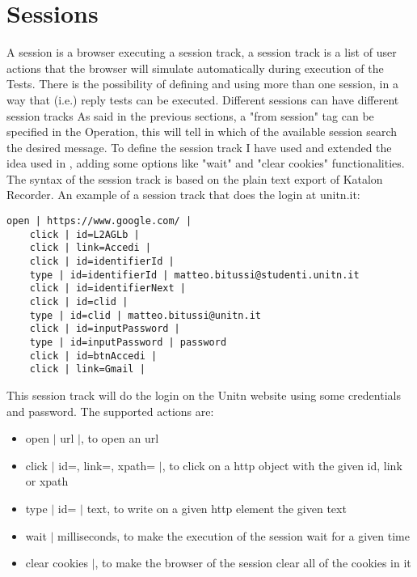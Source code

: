 \section{Sessions}
A session is a browser executing a \gls{session track}, a \gls{session track} is a list of user actions that the browser will simulate automatically during execution of the Tests. There is the possibility of defining and using more than one session, in a way that (i.e.) reply tests can be executed. Different sessions can have different session tracks
As said in the previous sections, a "from session" tag can be specified in the Operation, this will tell in which of the available session search the desired message. To define the \gls{session track} I have used and extended the idea used in \cite{giulio_pellizzari}\cite{claudio_grisenti}\cite{stefano_facchini}, adding some options like "wait" and "clear cookies" functionalities.
The syntax of the \gls{session track} is based on the plain text export of Katalon Recorder\cite{katalon_recorder_syntax}.
An example of a \gls{session track} that does the login at unitn.it:

\begin{lstlisting}[]
    open | https://www.google.com/ |
    click | id=L2AGLb |
    click | link=Accedi |
    click | id=identifierId |
    type | id=identifierId | matteo.bitussi@studenti.unitn.it
    click | id=identifierNext |
    click | id=clid |
    type | id=clid | matteo.bitussi@unitn.it
    click | id=inputPassword |
    type | id=inputPassword | password
    click | id=btnAccedi |
    click | link=Gmail |
\end{lstlisting}

This \gls{session track} will do the login on the Unitn website using some credentials and password. The supported actions are:
\begin{itemize}
    \item open $|$ url $|$, to open an url
    \item click $|$ id=, link=, xpath= $|$, to click on a http object with the given id, link or xpath
    \item type $|$ id= $|$ text, to write on a given http element the given text
    \item wait $|$ milliseconds, to make the execution of the session wait for a given time 
    \item clear cookies $|$, to make the browser of the session clear all of the cookies in it
\end{itemize}



